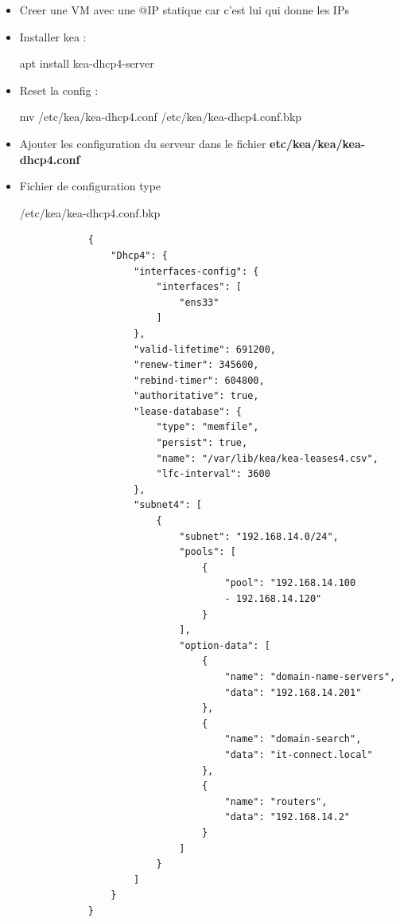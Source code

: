 \documentclass{article}
\begin{document}
\begin{itemize}
    \item Creer une VM avec une @IP statique car c’est lui qui donne les IPs
    \item Installer kea : \begin{rootcommand} apt install kea-dhcp4-server \end{rootcommand}
    \item Reset la config : \begin{rootcommand} mv /etc/kea/kea-dhcp4.conf /etc/kea/kea-dhcp4.conf.bkp \end{rootcommand}
    \item Ajouter les configuration du serveur dans le fichier \textbf{etc/kea/kea/kea-dhcp4.conf}
    \item Fichier de configuration type
    \newpage
    \begin{configbox}{/etc/kea/kea-dhcp4.conf.bkp}
        \begin{lstlisting}
            {
                "Dhcp4": {
                    "interfaces-config": {
                        "interfaces": [
                            "ens33"
                        ]
                    },
                    "valid-lifetime": 691200,
                    "renew-timer": 345600,
                    "rebind-timer": 604800,
                    "authoritative": true,
                    "lease-database": {
                        "type": "memfile",
                        "persist": true,
                        "name": "/var/lib/kea/kea-leases4.csv",
                        "lfc-interval": 3600
                    },
                    "subnet4": [
                        {
                            "subnet": "192.168.14.0/24",
                            "pools": [
                                {
                                    "pool": "192.168.14.100 
                                    - 192.168.14.120"
                                }
                            ],
                            "option-data": [
                                {
                                    "name": "domain-name-servers",
                                    "data": "192.168.14.201"
                                },
                                {
                                    "name": "domain-search",
                                    "data": "it-connect.local"
                                },
                                {
                                    "name": "routers",
                                    "data": "192.168.14.2"
                                }
                            ]
                        }
                    ]
                }
            }
        \end{lstlisting}
       
        

    \end{configbox}

\end{itemize}
\end{document}
